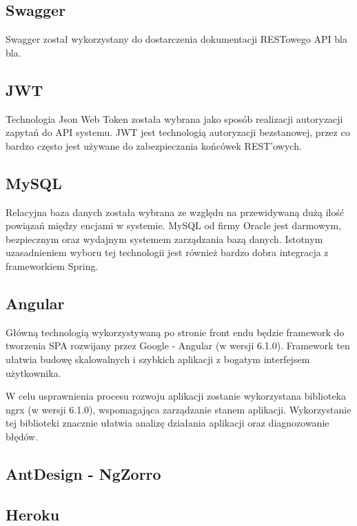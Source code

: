 \subsection{Swagger}

Swagger został wykorzystany do dostarczenia dokumentacji RESTowego API bla bla.

\subsection{JWT}

Technologia Json Web Token została wybrana jako sposób realizacji autoryzacji zapytań do API systemu. JWT jest technologią autoryzacji bezstanowej, przez co bardzo często jest używane do zabezpieczania końcówek REST'owych.

\subsection{MySQL} 

Relacyjna baza danych została wybrana ze względu na przewidywaną dużą ilość powiązań między encjami w systemie. MySQL od firmy Oracle jest darmowym, bezpiecznym oraz wydajnym systemem zarządzania bazą danych.  Istotnym uzasadnieniem wyboru tej technologii jest również bardzo dobra integracja z frameworkiem Spring.

\subsection{Angular}

Główną technologią wykorzystywaną po stronie front endu będzie framework do tworzenia SPA rozwijany przez Google - Angular (w wersji 6.1.0). Framework ten ułatwia budowę skalowalnych i szybkich aplikacji z bogatym interfejsem użytkownika. 

W celu usprawnienia procesu rozwoju aplikacji zostanie wykorzystana biblioteka ngrx (w wersji 6.1.0), wspomagająca zarządzanie stanem aplikacji. Wykorzystanie tej biblioteki znacznie ułatwia analizę działania aplikacji oraz diagnozowanie błędów.

\subsection{AntDesign - NgZorro}

\subsection{Heroku}
